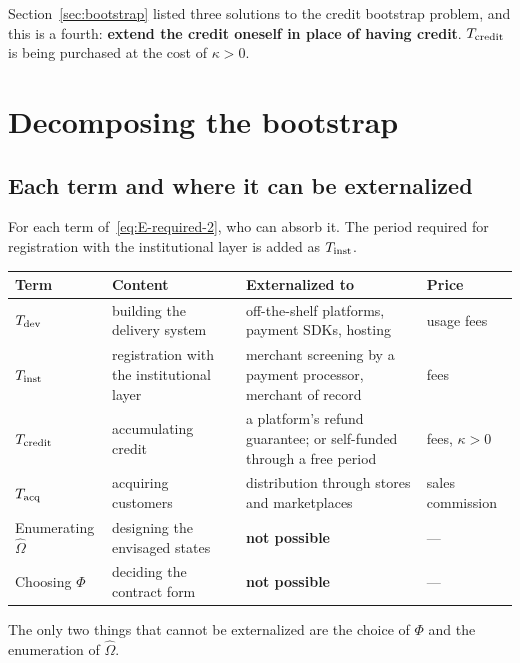 Section~\ref{sec:bootstrap} listed three solutions to the credit bootstrap problem, and
this is a fourth: \textbf{extend the credit oneself in place of having credit}.
$T_{\rm credit}$ is being purchased at the cost of $\kappa>0$.

\section{Decomposing the bootstrap}

\subsection{Each term and where it can be externalized}

For each term of~\eqref{eq:E-required-2}, who can absorb it. The period required for
registration with the institutional layer is added as $T_{\rm inst}$.

\begin{center}
\begin{tabularx}{\textwidth}{@{}lXXl@{}}
\toprule
Term & Content & Externalized to & Price \\
\midrule
$T_{\rm dev}$ & building the delivery system & off-the-shelf platforms, payment SDKs, hosting & usage fees \\
$T_{\rm inst}$ & registration with the institutional layer & merchant screening by a payment processor, merchant of record & fees \\
$T_{\rm credit}$ & accumulating credit & a platform's refund guarantee; or self-funded through a free period & fees, $\kappa>0$ \\
$T_{\rm acq}$ & acquiring customers & distribution through stores and marketplaces & sales commission \\
Enumerating $\hat\Omega$ & designing the envisaged states & \textbf{not possible} & --- \\
Choosing $\Phi$ & deciding the contract form & \textbf{not possible} & --- \\
\bottomrule
\end{tabularx}
\label{tab:bootstrap-outsourcing}
\end{center}

\begin{proposition}
The only two things that cannot be externalized are the choice of $\Phi$ and the enumeration
of $\hat\Omega$.
\end{proposition}

